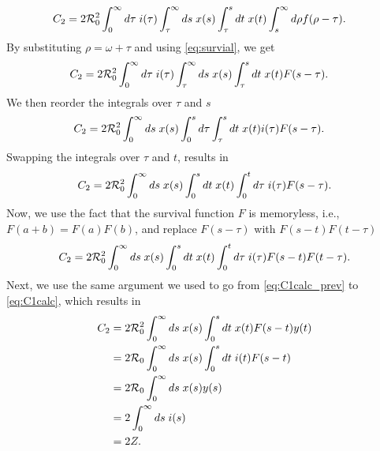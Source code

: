 \begin{align*}
    \begin{split}
        C_2 &= 2{\mathcal R}_{\mathrm{0}}^2 \int_0^\infty d\tau \; i(\tau) \int_\tau^\infty ds \; x(s) \int_\tau^s dt \; x(t)\int_s^\infty d\rho f(\rho-\tau). 
    \end{split}
\end{align*}
By substituting $\rho = \omega + \tau$ and using \autoref{eq:survial}, we get
\begin{align*}
    \begin{split}
        C_2 &= 2{\mathcal R}_{\mathrm{0}}^2 \int_0^\infty d\tau \; i(\tau) \int_\tau^\infty ds \; x(s) \int_\tau^s dt \; x(t)F(s-\tau).
    \end{split}
\end{align*}
We then reorder the integrals over $\tau$ and $s$
\begin{align*}
    \begin{split}
        C_2 &= 2{\mathcal R}_{\mathrm{0}}^2 \int_0^\infty ds\;x(s)\int_0^s d\tau \int_\tau^s dt\; x(t)i(\tau)F(s-\tau).
    \end{split}
\end{align*}
 Swapping the integrals over $\tau$ and $t$, results in
\begin{align*}
        C_2 = 2{\mathcal R}_{\mathrm{0}}^2 \int_0^\infty ds\;x(s)\int_0^s dt \; x(t) \int_0^t d\tau\;i(\tau)F(s-\tau).
\end{align*}
Now, we use the fact that the survival function $F$ is memoryless, i.e., $F(a+b) = F(a)F(b)$, and replace $F(s-\tau)$ with $F(s-t)F(t-\tau)$
    \begin{equation*}
        C_2 = 2{\mathcal R}_{\mathrm{0}}^2 \int_0^\infty ds\;x(s)\int_0^s dt \; x(t) \int_0^t d\tau\;i(\tau)F(s-t)F(t-\tau).
    \end{equation*}
Next, we use the same argument we used to go from \autoref{eq:C1calc_prev} to \autoref{eq:C1calc}, which results in
\begin{align*}
        C_2 &= 2{\mathcal R}_{\mathrm{0}}^2 \int_0^\infty ds\;x(s)\int_0^s dt \; x(t) F(s-t)y(t)\\
        &= 2{\mathcal R}_{\mathrm{0}} \int_0^\infty ds\;x(s)\int_0^s dt \; i(t) F(s-t)\\
        &= 2{\mathcal R}_{\mathrm{0}} \int_0^\infty ds\;x(s)y(s)\\
        &= 2 \int_0^\infty ds\;i(s)\\
        &= 2Z.
\end{align*}

